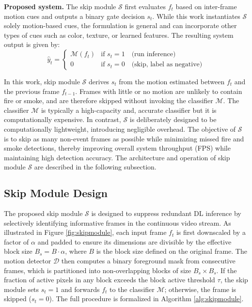 \documentclass[
  10pt,
]{article}
\begin{document}
\textbf{Proposed system.} The skip module \(\mathcal{S}\) first
evaluates \(f_t\) based on inter-frame motion cues and outputs a binary
gate decision \(s_t\). While this work instantiates \(\mathcal{S}\)
solely motion-based cues, the formulation is general and can incorporate
other types of cues such as color, texture, or learned features. The
resulting system output is given by: \[
\hat{y}_t = \begin{cases} \mathcal{M}(f_t) & \text{if } s_t = 1 \quad
\text{(run inference)} \\ 0 & \text{if } s_t = 0 \quad \text{(skip, label as
negative)} \end{cases}
\]

In this work, skip module \(\mathcal{S}\) derives \(s_t\) from the
motion estimated between \(f_t\) and the previous frame \(f_{t-1}\).
Frames with little or no motion are unlikely to contain fire or smoke,
and are therefore skipped without invoking the classifier
\(\mathcal{M}\). The classifier \(\mathcal{M}\) is typically a
high-capacity and, accurate classifier but it is computationally
expensive. In contrast, \(\mathcal{S}\) is deliberately designed to be
computationally lightweight, introducing negligible overhead. The
objective of \(\mathcal{S}\) is to skip as many non-event frames as
possible while minimizing missed fire and smoke detections, thereby
improving overall system throughput (FPS) while maintaining high
detection accuracy. The architecture and operation of skip module
\(\mathcal{S}\) are described in the following subsection.

\subsection{Skip Module Design}\label{skip-module-design}





The proposed skip module \(\mathcal{S}\) is designed to suppress
redundant DL inference by selectively identifying informative frames in
the continuous video stream. As illustrated in Figure
\ref{fig:skipmodule}, each input frame \(f_t\) is first downscaled by a
factor of \(\alpha\) and padded to ensure its dimensions are divisible
by the effective block size \(B_s = B \cdot \alpha\), where \(B\) is the
block size defined on the original frame. The motion detector
\(\mathcal{D}\) then computes a binary foreground mask from consecutive
frames, which is partitioned into non-overlapping blocks of size
\(B_s \times B_s\). If the fraction of active pixels in any block
exceeds the block active threshold \(\tau\), the skip module sets
\(s_t = 1\) and forwards \(f_t\) to the classifier \(\mathcal{M}\);
otherwise, the frame is skipped (\(s_t = 0\)). The full procedure is
formalized in Algorithm \ref{alg:skipmodule}.
\end{document}
